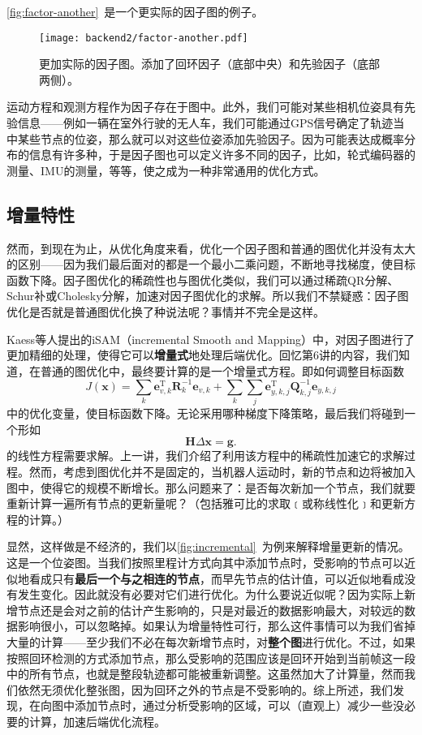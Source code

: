 \autoref{fig:factor-another}~是一个更实际的因子图的例子。

\begin{figure}[!htp]
	\centering
	\texttt{[image: backend2/factor-another.pdf]}
	\caption{更加实际的因子图。添加了回环因子（底部中央）和先验因子（底部两侧）。}
	\label{fig:factor-another}
\end{figure}

运动方程和观测方程作为因子存在于图中。此外，我们可能对某些相机位姿具有先验信息——例如一辆在室外行驶的无人车，我们可能通过GPS信号确定了轨迹当中某些节点的位姿，那么就可以对这些位姿添加先验因子。因为可能表达成概率分布的信息有许多种，于是因子图也可以定义许多不同的因子，比如，轮式编码器的测量、IMU的测量，等等，使之成为一种非常通用的优化方式。

\subsection{增量特性}
然而，到现在为止，从优化角度来看，优化一个因子图和普通的图优化并没有太大的区别——因为我们最后面对的都是一个最小二乘问题，不断地寻找梯度，使目标函数下降。因子图优化的稀疏性也与图优化类似，我们可以通过稀疏QR分解、Schur补或Cholesky分解，加速对因子图优化的求解。所以我们不禁疑惑：因子图优化是否就是普通图优化换了种说法呢？事情并不完全是这样。

Kaess等人提出的iSAM（incremental Smooth and Mapping）\textsuperscript{\cite{Kaess2008}}中，对因子图进行了更加精细的处理，使得它可以\textbf{增量式}地处理后端优化。回忆第6讲的内容，我们知道，在普通的图优化中，最终要计算的是一个增量式方程。即如何调整目标函数
\begin{equation}
J (\bm{x}) = \sum\limits_k {\bm{e}_{v,k}^\mathrm{T} \bm{R}_k^{ - 1}{ \bm{e}_{v,k}}}  + \sum\limits_k {\sum\limits_j {\bm{e}_{y,k,j}^\mathrm{T} \bm{Q}_{k,j}^{ - 1}{\bm{e}_{y,k,j}}} }
\end{equation}
中的优化变量，使目标函数下降。无论采用哪种梯度下降策略，最后我们将碰到一个形如
\begin{equation}
\bm{H} \Delta \bm{x} = \bm{g}.
\end{equation}
的线性方程需要求解。上一讲，我们介绍了利用该方程中的稀疏性加速它的求解过程。然而，考虑到图优化并不是固定的，当机器人运动时，新的节点和边将被加入图中，使得它的规模不断增长。那么问题来了：是否每次新加一个节点，我们就要重新计算一遍所有节点的更新量呢？（包括雅可比的求取﹝或称线性化﹞和更新方程的计算。）

显然，这样做是不经济的，我们以\autoref{fig:incremental}~为例来解释增量更新的情况。这是一个位姿图。当我们按照里程计方式向其中添加节点时，受影响的节点可以近似地看成只有\textbf{最后一个与之相连的节点}，而早先节点的估计值，可以近似地看成没有发生变化。因此就没有必要对它们进行优化。为什么要说近似呢？因为实际上新增节点还是会对之前的估计产生影响的，只是对最近的数据影响最大，对较远的数据影响很小，可以忽略掉。如果认为增量特性可行，那么这件事情可以为我们省掉大量的计算——至少我们不必在每次新增节点时，对\textbf{整个图}进行优化。不过，如果按照回环检测的方式添加节点，那么受影响的范围应该是回环开始到当前帧这一段中的所有节点，也就是整段轨迹都可能被重新调整。这虽然加大了计算量，然而我们依然无须优化整张图，因为回环之外的节点是不受影响的。综上所述，我们发现，在向图中添加节点时，通过分析受影响的区域，可以（直观上）减少一些没必要的计算，加速后端优化流程。

